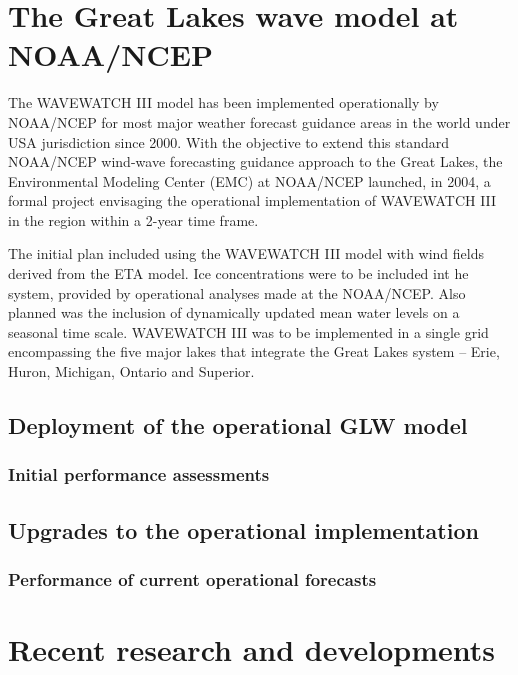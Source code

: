 \documentclass[12pt,english]{article}
\begin{document}






\section{The Great Lakes wave model at NOAA/NCEP}

The WAVEWATCH III model has been implemented operationally by NOAA/NCEP for most
major weather forecast guidance areas in the world under USA jurisdiction since
2000. With the objective to extend this standard NOAA/NCEP wind-wave forecasting
guidance approach to the Great Lakes, the Environmental Modeling Center (EMC) at
NOAA/NCEP launched, in 2004, a formal project envisaging the operational
implementation of WAVEWATCH III in the region within a 2-year time frame. 

The initial plan included using the WAVEWATCH III model with wind fields derived
from the ETA model. Ice concentrations were to be included int he system,
provided by operational analyses made at the NOAA/NCEP. Also planned was the
inclusion of dynamically updated mean water levels on a seasonal time scale.
WAVEWATCH III was to be implemented in a single grid encompassing the five major
lakes that integrate the Great Lakes system -- Erie, Huron, Michigan, Ontario
and Superior.



\subsection{Deployment of the operational GLW model}

\subsubsection{Initial performance assessments}

\subsection{Upgrades to the operational implementation}

\subsubsection{Performance of current operational forecasts}

\section{Recent research and developments}
\end{document}
